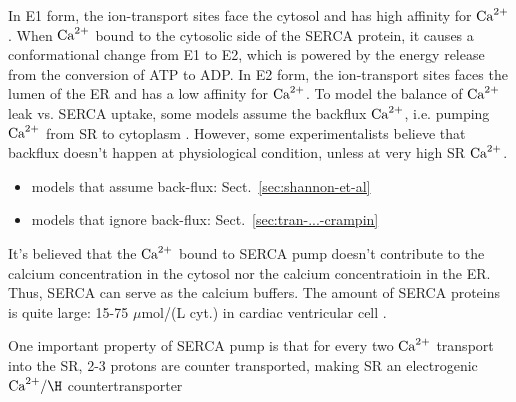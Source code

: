 In E1 form, the ion-transport sites face the cytosol and has high affinity for
${\text{Ca}^{2+}}$. When ${\text{Ca}^{2+}}$ bound to the cytosolic side of the SERCA protein, it causes a
conformational change from E1 to E2, which is powered by the energy release from
the conversion of ATP to ADP. In E2 form, the ion-transport sites faces the
lumen of the ER and has a low affinity for ${\text{Ca}^{2+}}$. To model the balance of ${\text{Ca}^{2+}}$
leak vs. SERCA uptake, some models assume the backflux ${\text{Ca}^{2+}}$, i.e. pumping ${\text{Ca}^{2+}}$
from SR to cytoplasm \citep{shannon2000rms}. However, some experimentalists
believe that backflux doesn't happen at physiological condition, unless at very
high SR ${\text{Ca}^{2+}}$.
\begin{itemize}
\item models that assume back-flux: Sect.~\ref{sec:shannon-et-al}

\item models that ignore back-flux: Sect.~\ref{sec:tran-...-crampin}
\end{itemize}
It's believed that the ${\text{Ca}^{2+}}$ bound to SERCA pump doesn't contribute to the
calcium concentration in the cytosol nor the calcium concentratioin in the ER.
Thus, SERCA can serve as the calcium buffers. The amount of SERCA proteins is
quite large: 15-75 $\mu$mol/(L cyt.) in cardiac ventricular cell
\citep{bers2001ecc}. 


One important property of SERCA pump is that for every two ${\text{Ca}^{2+}}$
transport into the SR, 2-3 protons are counter transported, making SR
an electrogenic $\Ca/\H$
countertransporter~\citep{Yu1993,Hao1994,Peinelt2002}

